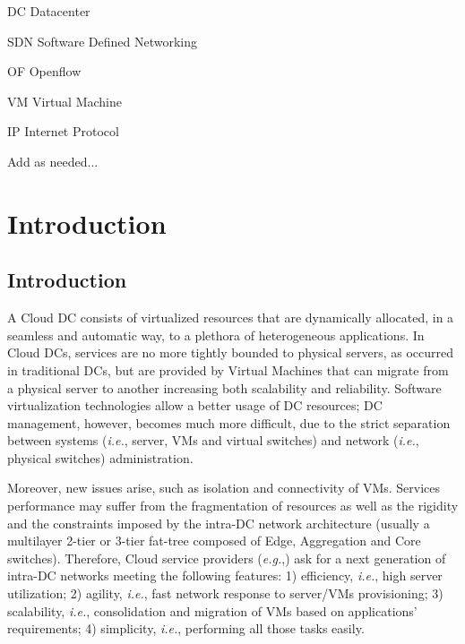 \documentclass[12pt,english]{book}
\newenvironment{lyxlist}[1]
   {\begin{list}{}
     {\settowidth{\labelwidth}{#1}
      \setlength{\leftmargin}{\labelwidth}
      \addtolength{\leftmargin}{\labelsep}
      \renewcommand{\makelabel}[1]{##1\hfil}}}
   {\end{list}}
\begin{document}


\begin{lyxlist}{00.00.0000}
\begin{singlespace}
\item [DC]Datacenter
\item [SDN]Software Defined Networking
\item [OF]Openflow
\item [VM]Virtual Machine
\item [IP]Internet Protocol 
\item Add as needed...
\end{singlespace}
\end{lyxlist}

\cleardoublepage

\listoffigures

\cleardoublepage

\listoftables

\cleardoublepage

\setcounter{page}{0}



\chapter{Introduction\label{cha:introduction}}

\section{Introduction}

A Cloud DC consists of virtualized resources that are dynamically allocated, in a seamless and automatic way, to a plethora of heterogeneous applications.
In Cloud DCs, services are no more tightly bounded to physical servers, as occurred in traditional DCs, but are provided by Virtual Machines that can migrate from a physical server to another increasing both scalability and reliability.
Software virtualization technologies allow a better usage of DC resources; DC management, however, becomes much more difficult, due to the strict separation between systems (\textit{i.e.}, server, VMs and virtual switches) and network (\textit{i.e.}, physical switches) administration.

Moreover, new issues arise, such as isolation and connectivity of VMs.
Services performance may suffer from the fragmentation of resources as well as the rigidity and the constraints imposed by the intra-DC network architecture (usually a multilayer 2-tier or 3-tier fat-tree composed of Edge, Aggregation and Core switches\cite{dc_arch}).
Therefore, Cloud service providers (\textit{e.g.},\cite{amazon}) ask for a next generation of intra-DC networks meeting the following features: 1) efficiency, \textit{i.e.}, high server utilization; 2) agility, \textit{i.e.}, fast network response to server/VMs provisioning; 3) scalability, \textit{i.e.}, consolidation and migration of VMs based on applications' requirements; 4) simplicity, \textit{i.e.}, performing all those tasks easily\cite{baldonado}.
\end{document}

